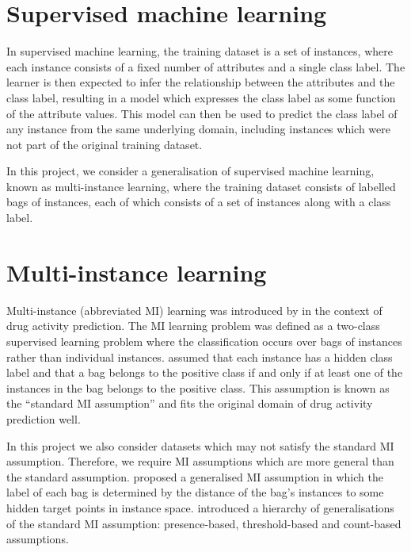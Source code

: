 \documentclass[a4paper,12pt]{report} %
\begin{document}
\section{Supervised machine learning}
\label{sec:bg:ml}

In supervised machine learning, the training dataset is a set of instances, 
    where each instance consists of a fixed number of attributes 
    and a single class label.
The learner is then expected to infer the relationship between the 
    attributes and the class label,
    resulting in a model which expresses the class label as 
    some function of the attribute values.
This model can then be used to predict the class label of 
    any instance from the same underlying domain, 
    including instances which were not part of the original training dataset.

In this project, we consider a generalisation of supervised machine learning, 
    known as multi-instance learning, 
    where the training dataset consists of labelled bags of instances, 
    each of which consists of a set of instances 
    along with a class label.

\section{Multi-instance learning}
\label{sec:bg:mil}

Multi-instance (abbreviated MI) learning was introduced by  
    in the context of drug activity prediction. 
The MI learning problem was 
    defined as a two-class supervised learning problem where 
    the classification occurs over bags of instances 
    rather than individual instances. 
 assumed that each instance has a hidden class label and 
    that a bag belongs to the positive class if and only if 
    at least one of the instances in the bag belongs to the positive class. 
This assumption is known as the ``standard MI assumption'' and 
    fits the original domain of drug activity prediction well.

In this project we also consider datasets which may not satisfy the
    standard MI assumption. 
Therefore, we require MI assumptions which are more general than 
    the standard assumption.
 proposed a generalised MI assumption in which 
    the label of each bag is determined by the 
    distance of the bag's instances to some hidden target points in instance space.    
 introduced a hierarchy of generalisations of 
    the standard MI assumption: presence-based, threshold-based and count-based assumptions.
    
\end{document}
